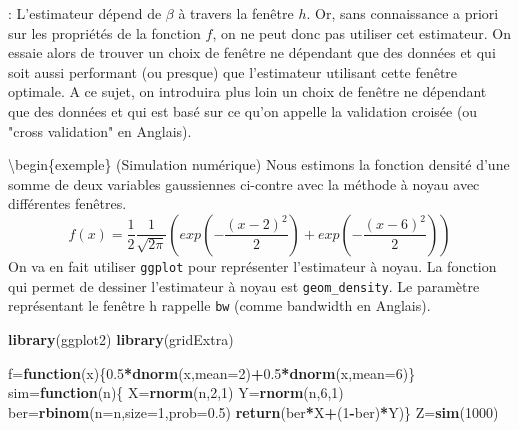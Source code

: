 \documentclass[
]{book}
\newenvironment{Shaded}{\begin{snugshade}}{\end{snugshade}}
\newcommand{\ControlFlowTok}[1]{\textcolor[rgb]{0.13,0.29,0.53}{\textbf{#1}}}
\newcommand{\DataTypeTok}[1]{\textcolor[rgb]{0.13,0.29,0.53}{#1}}
\newcommand{\DecValTok}[1]{\textcolor[rgb]{0.00,0.00,0.81}{#1}}
\newcommand{\FloatTok}[1]{\textcolor[rgb]{0.00,0.00,0.81}{#1}}
\newcommand{\KeywordTok}[1]{\textcolor[rgb]{0.13,0.29,0.53}{\textbf{#1}}}
\newcommand{\NormalTok}[1]{#1}
\newcommand{\OperatorTok}[1]{\textcolor[rgb]{0.81,0.36,0.00}{\textbf{#1}}}
\theoremstyle{definition}
\theoremstyle{definition}
\theoremstyle{definition}
\theoremstyle{definition}
\theoremstyle{remark}
\begin{document}
\begin{cmtr}: L'estimateur dépend de $\beta$ à travers la fenêtre $h$. Or, sans   connaissance a priori sur les propriétés de la fonction $f$, on ne peut donc pas utiliser cet estimateur. On essaie alors de trouver un choix de fenêtre ne dépendant que des données et qui soit aussi performant (ou presque) que l'estimateur utilisant cette fenêtre optimale. A ce sujet, on introduira plus loin un choix de fenêtre ne dépendant que des données et qui est basé sur ce qu'on appelle la validation croisée (ou "cross validation" en Anglais).  \newline
\end{cmtr}

\textbackslash begin\{exemple\} (Simulation numérique)
Nous estimons la fonction densité d'une somme de deux variables gaussiennes ci-contre avec la méthode à noyau avec différentes fenêtres.
\[
f(x)=\frac{1}{2}\frac{1}{\sqrt{2\pi}}(exp(-\frac{(x-2)^2}{2})+exp(-\frac{(x-6)^2}{2}))
\]
On va en fait utiliser \texttt{ggplot} pour représenter l'estimateur à noyau. La fonction qui permet de dessiner l'estimateur à noyau est \texttt{geom\_density}. Le paramètre représentant le fenêtre h rappelle \texttt{bw} (comme bandwidth en Anglais).

\begin{Shaded}
\begin{Highlighting}[]
\KeywordTok{library}\NormalTok{(ggplot2)}
\KeywordTok{library}\NormalTok{(gridExtra)}

\NormalTok{f=}\ControlFlowTok{function}\NormalTok{(x)\{}\FloatTok{0.5}\OperatorTok{*}\KeywordTok{dnorm}\NormalTok{(x,}\DataTypeTok{mean=}\DecValTok{2}\NormalTok{)}\OperatorTok{+}\FloatTok{0.5}\OperatorTok{*}\KeywordTok{dnorm}\NormalTok{(x,}\DataTypeTok{mean=}\DecValTok{6}\NormalTok{)\}}
\NormalTok{sim=}\ControlFlowTok{function}\NormalTok{(n)\{}
\NormalTok{X=}\KeywordTok{rnorm}\NormalTok{(n,}\DecValTok{2}\NormalTok{,}\DecValTok{1}\NormalTok{)}
\NormalTok{Y=}\KeywordTok{rnorm}\NormalTok{(n,}\DecValTok{6}\NormalTok{,}\DecValTok{1}\NormalTok{)}
\NormalTok{ber=}\KeywordTok{rbinom}\NormalTok{(}\DataTypeTok{n=}\NormalTok{n,}\DataTypeTok{size=}\DecValTok{1}\NormalTok{,}\DataTypeTok{prob=}\FloatTok{0.5}\NormalTok{)}
\KeywordTok{return}\NormalTok{(ber}\OperatorTok{*}\NormalTok{X}\OperatorTok{+}\NormalTok{(}\DecValTok{1}\OperatorTok{-}\NormalTok{ber)}\OperatorTok{*}\NormalTok{Y)\}}
\NormalTok{Z=}\KeywordTok{sim}\NormalTok{(}\DecValTok{1000}\NormalTok{)}
\end{Highlighting}
\end{Shaded}
\end{document}
